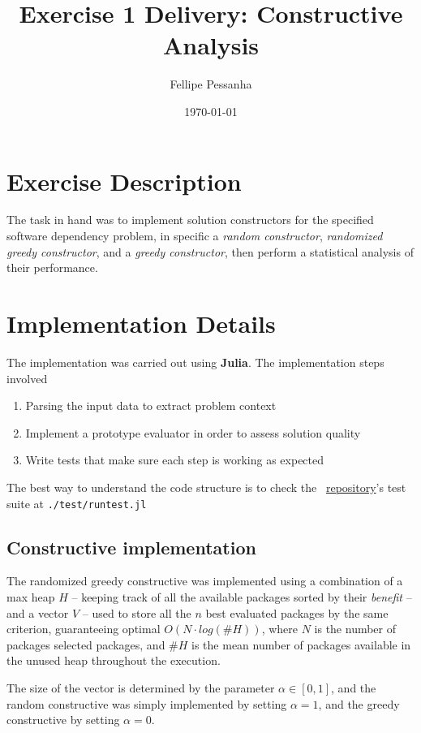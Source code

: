 \documentclass[a4paper,10pt]{article}
\title{Exercise 1 Delivery: Constructive Analysis}
\author{Fellipe Pessanha}
\date{\today}
\begin{document}
\maketitle

\section{Exercise Description}
The task in hand was to implement solution constructors for the specified software dependency
problem, in specific a \textit{random constructor}, \textit{randomized greedy constructor},
and a \textit{greedy constructor}, then perform a statistical analysis of their performance.


\section{Implementation Details}
The implementation was carried out using \textbf{Julia}. The implementation steps involved
\begin{enumerate}
    \item Parsing the input data to extract problem context
    \item Implement a prototype evaluator in order to assess solution quality
    \item Write tests that make sure each step is working as expected
\end{enumerate}

The best way to understand the code structure is to check the~
\href{https://github.com/fellipessanha/postgrad-metaheuristics}{repository}'s test suite at
\texttt{./test/runtest.jl}

\subsection{Constructive implementation}

The randomized greedy constructive was implemented using a combination of a max heap $H$ --
keeping track of all the available packages sorted by their \textit{benefit} -- and a vector $V$
-- used to store all the $n$ best evaluated packages by the same criterion, guaranteeing
optimal $O(N \cdot log(\#H))$, where $N$ is the number of packages selected packages, and $\#H$
is the mean number of packages available in the unused heap throughout the execution.

The size of the vector is determined by the parameter $\alpha \in [0, 1]$, and the random
constructive was simply implemented by setting $\alpha = 1$, and the greedy constructive by
setting $\alpha = 0$.
\end{document}
